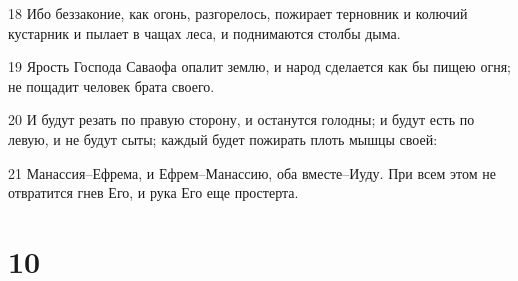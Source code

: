 \par 18 Ибо беззаконие, как огонь, разгорелось, пожирает терновник и колючий кустарник и пылает в чащах леса, и поднимаются столбы дыма.
\par 19 Ярость Господа Саваофа опалит землю, и народ сделается как бы пищею огня; не пощадит человек брата своего.
\par 20 И будут резать по правую сторону, и останутся голодны; и будут есть по левую, и не будут сыты; каждый будет пожирать плоть мышцы своей:
\par 21 Манассия--Ефрема, и Ефрем--Манассию, оба вместе--Иуду. При всем этом не отвратится гнев Его, и рука Его еще простерта.

\chapter{10}

